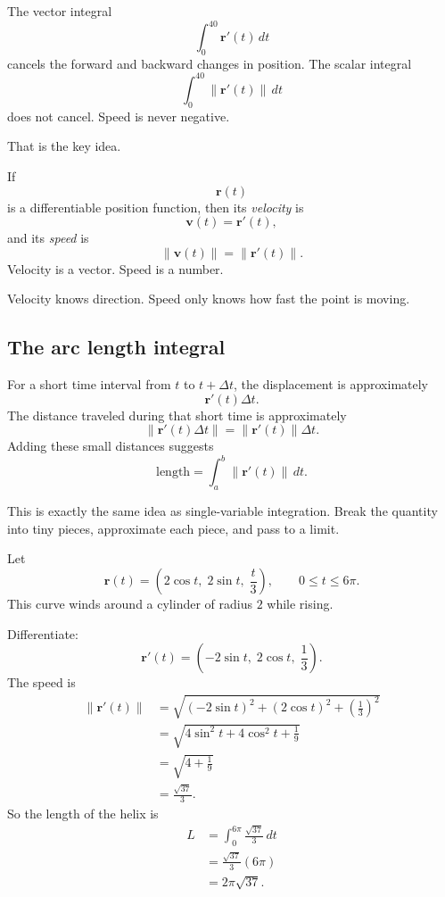 The vector integral
\[
    \int_0^{40}\mathbf r'(t)\,dt
\]
cancels the forward and backward changes in position.  The scalar integral
\[
    \int_0^{40}\|\mathbf r'(t)\|\,dt
\]
does not cancel.  Speed is never negative.

That is the key idea.

\begin{definition}[Speed]
If
\[
    \mathbf r(t)
\]
is a differentiable position function, then its \emph{velocity} is
\[
    \mathbf v(t)=\mathbf r'(t),
\]
and its \emph{speed} is
\[
\boxed{
    \|\mathbf v(t)\|=\|\mathbf r'(t)\|.
}
\]
Velocity is a vector.  Speed is a number.
\end{definition}

Velocity knows direction.  Speed only knows how fast the point is moving.

\subsection{The arc length integral}

For a short time interval from \(t\) to \(t+\Delta t\), the displacement is approximately
\[
    \mathbf r'(t)\Delta t.
\]
The distance traveled during that short time is approximately
\[
    \|\mathbf r'(t)\Delta t\|
    =
    \|\mathbf r'(t)\|\Delta t.
\]
Adding these small distances suggests
\[
    \text{length}
    =
    \int_a^b \|\mathbf r'(t)\|\,dt.
\]

This is exactly the same idea as single-variable integration.  Break the quantity into
tiny pieces, approximate each piece, and pass to a limit.

\begin{example}
Let
\[
    \mathbf r(t)=
    \left(2\cos t,\;2\sin t,\;\frac{t}{3}\right),
    \qquad 0\le t\le 6\pi.
\]
This curve winds around a cylinder of radius \(2\) while rising.

Differentiate:
\[
    \mathbf r'(t)=
    \left(-2\sin t,\;2\cos t,\;\frac13\right).
\]
The speed is
\[
\begin{aligned}
    \|\mathbf r'(t)\|
    &=
    \sqrt{(-2\sin t)^2+(2\cos t)^2+\left(\frac13\right)^2}\\
    &=
    \sqrt{4\sin^2t+4\cos^2t+\frac19}\\
    &=
    \sqrt{4+\frac19}\\
    &=
    \frac{\sqrt{37}}{3}.
\end{aligned}
\]
So the length of the helix is
\[
\begin{aligned}
    L
    &=
    \int_0^{6\pi}\frac{\sqrt{37}}{3}\,dt\\
    &=
    \frac{\sqrt{37}}{3}(6\pi)\\
    &=
    2\pi\sqrt{37}.
\end{aligned}
\]
\end{example}

